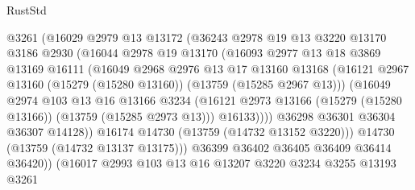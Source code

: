 \begin{lexlean}{RustStd}
\begin{coremodule}
                      @3261
                      (@16029
                        @2979
                        @13
                        @13172
                        (@36243
                          @2978
                          @19
                          @13
                          @3220
                          @13170
                          @3186
                          @2930
                          (@16044
                            @2978
                            @19
                            @13170
                            (@16093
                              @2977
                              @13
                              @18
                              @3869
                              @13169
                              @16111
                              (@16049
                                @2968
                                @2976
                                @13
                                @17
                                @13160
                                @13168
                                (@16121
                                  @2967
                                  @13160
                                  (@15279 (@15280 @13160))
                                  (@13759 (@15285 @2967 @13)))
                                (@16049
                                  @2974
                                  @103
                                  @13
                                  @16
                                  @13166
                                  @3234
                                  (@16121
                                    @2973
                                    @13166
                                    (@15279 (@15280 @13166))
                                    (@13759 (@15285 @2973 @13)))
                                  @16133))))
                          @36298
                          @36301
                          @36304
                          @36307
                          @14128))
                      @16174
                      @14730
                      (@13759 (@14732 @13152 @3220)))
                    @14730
                    (@13759 (@14732 @13137 @13175)))
                  @36399
                  @36402
                  @36405
                  @36409
                  @36414
                  @36420))
              (@16017
                @2993
                @103
                @13
                @16
                @13207
                @3220
                @3234
                @3255
                @13193
                @3261

\end{coremodule}
\end{lexlean}
